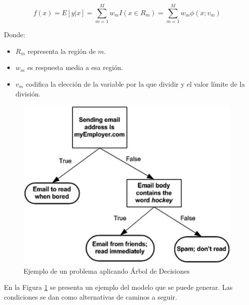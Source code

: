 \begin{Large}
	\begin{equation}
		f(x)=E[y|x]=\sum_{m=1}^{M}w_{m}I(x \in R_{m})=\sum_{m=1}^{M}w_{m}\phi(x;v_{m})
		\label{eq:Ecuación del Modelo Decision Tree}
	\end{equation}
\end{Large}

Donde:

\begin{itemize}
	\item $R_{m}$ representa la región de $m$.
	\item $w_{m}$ es respuesta media a esa región.
	\item $v_{m}$ codifica la elección de la variable por la que dividir y el valor límite de la división.
\end{itemize}


\begin{figure}[H]
	\centering
	\includegraphics[scale=1.3]{img/Marco Teorico/arbol de desicion.png} 
	\caption{Ejemplo de un problema aplicando Árbol de Decisiones}
	\label{fig:padt2}
\end{figure}

\par En la Figura \ref{fig:padt2} se presenta un ejemplo del modelo que se puede generar. Las condiciones se dan como alternativas de caminos a seguir.\\

\doublespacing
